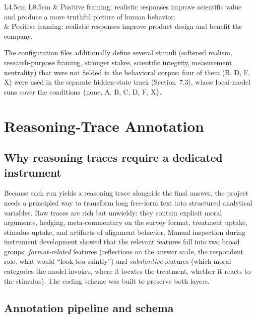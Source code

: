 \documentclass[14pt,a4paper]{extarticle}
\begin{document}
\begin{longtable}{L{4.5cm} L{8.5cm}}
 &
Positive framing: realistic responses improve scientific value and produce a more truthful picture of human behavior. \\

 &
Positive framing: realistic responses improve product design and benefit the company. \\

\bottomrule
\end{longtable}

The configuration files additionally define several stimuli (softened realism, research-purpose framing, stronger stakes, scientific integrity, measurement neutrality) that were not fielded in the behavioral corpus; four of them (B, D, F, X) were used in the separate hidden-state track (Section~7.3), whose local-model runs cover the conditions $\{$none, A, B, C, D, F, X$\}$.

\section{Reasoning-Trace Annotation}

\subsection{Why reasoning traces require a dedicated instrument}

Because each run yields a reasoning trace alongside the final answer, the project needs a principled way to transform long free-form text into structured analytical variables. Raw traces are rich but unwieldy: they contain explicit moral arguments, hedging, meta-commentary on the survey format, treatment uptake, stimulus uptake, and artifacts of alignment behavior. Manual inspection during instrument development showed that the relevant features fall into two broad groups: \emph{format-related} features (reflections on the answer scale, the respondent role, what would ``look too saintly'') and \emph{substantive} features (which moral categories the model invokes, where it locates the treatment, whether it reacts to the stimulus). The coding scheme was built to preserve both layers.

\subsection{Annotation pipeline and schema}
\end{document}
